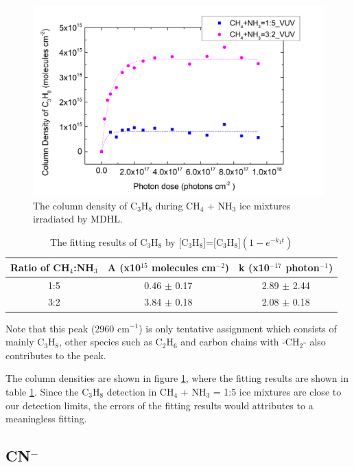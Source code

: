 \begin{figure}
\centering
\includegraphics[width=\textwidth]{figures/chapter3/C3H8_VUV.png}
\caption{The column density of C$_3$H$_8$ during CH$_4$ + NH$_3$ ice mixtures irradiated by MDHL. }
\label{fig:lab_C3H8}
\end{figure}

\begin{table}[htbp]
\caption{The fitting results of C$_3$H$_8$ by [C$_3$H$_8$]=[C$_3$H$_8$]$(1 - e^{-k_1 t})$}
\label{tab:fittingC3H8}
\begin{tabular}{ccc}
\hline
\hline
Ratio of CH$_4$:NH$_3$ & A (x10$^{15}$ molecules cm$^{-2}$) & k (x10$^{-17}$ photon$^{-1}$) \\
\hline
1:5 & 0.46 $\pm$ 0.17 & 2.89 $\pm$ 2.44 \\
3:2 & 3.84 $\pm$ 0.18 & 2.08 $\pm$ 0.18 \\
\hline
\end{tabular}
Note that this peak (2960 cm$^{-1}$) is only tentative assignment which consists of mainly C$_3$H$_8$, other species such as C$_2$H$_6$ and carbon chains with -CH$_2$- also contributes to the peak.
\end{table}

The column densities are shown in figure \ref{fig:lab_C3H8}, where the fitting results are shown in table \ref{tab:fittingC3H8}. Since the C$_3$H$_8$ detection in CH$_4$ + NH$_3$ = 1:5 ice mixtures are close to our detection limits, the errors of the fitting results would attributes to a meaningless fitting.

\subsection{CN$^-$}

